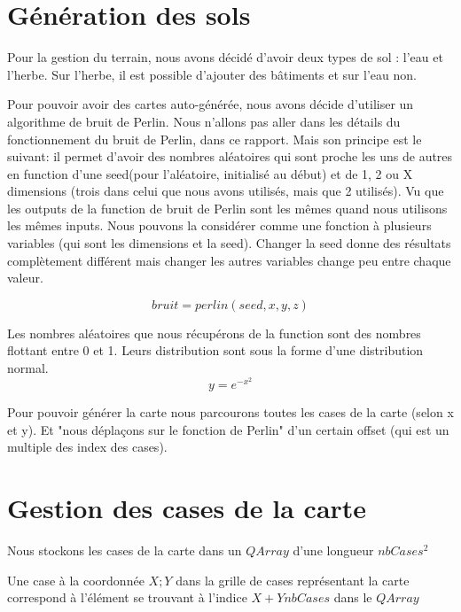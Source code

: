 \documentclass[a4paper,10pt,openany,oneside]{book}
\begin{document}
\section{Génération des sols}
Pour la gestion du terrain, nous avons décidé d'avoir deux types de sol : l'eau et l'herbe. Sur l'herbe, il est possible d'ajouter des bâtiments et sur l'eau non.

Pour pouvoir avoir des cartes auto-générée, nous avons décide d'utiliser un algorithme de bruit de Perlin. Nous n'allons pas aller dans les détails du fonctionnement du bruit de Perlin, dans ce rapport. Mais son principe est le suivant: il permet d'avoir des nombres aléatoires qui sont proche les uns de autres en function d'une seed(pour l'aléatoire, initialisé au début) et de 1, 2 ou X dimensions (trois dans celui que nous avons utilisés, mais que 2 utilisés). Vu que les outputs de la function de bruit de Perlin sont les mêmes quand nous utilisons les mêmes inputs. Nous pouvons la considérer comme une fonction à plusieurs variables (qui sont les dimensions et la seed). Changer la seed donne des résultats complètement différent mais changer les autres variables change peu entre chaque valeur.

\[bruit = perlin(seed, x, y, z)\]

Les nombres aléatoires que nous récupérons de la function sont des nombres flottant entre 0 et 1.
Leurs distribution sont sous la forme d'une distribution normal.
\[y=e^{-x^{2}}\]

Pour pouvoir générer la carte nous parcourons toutes les cases de la carte (selon x et y). Et "nous déplaçons sur le fonction de Perlin" d'un certain offset (qui est un multiple des index des cases).
\section{Gestion des cases de la carte}
Nous stockons les cases de la carte dans un $QArray$ d'une longueur $nbCases^{2}$

Une case à la coordonnée $X;Y$ dans la grille de cases représentant la carte correspond à l'élément se trouvant à l'indice $X+Y nbCases$ dans le $QArray$
\end{document}
